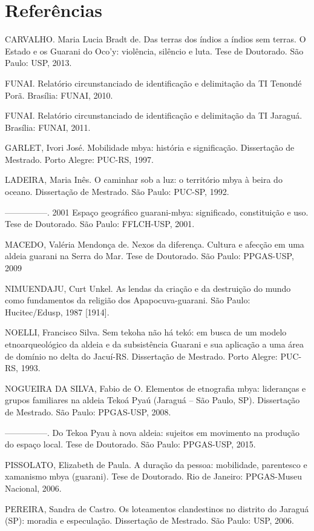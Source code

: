 \section{Referências} 

CARVALHO. Maria Lucia Bradt de. Das terras dos índios a índios sem
terras. O Estado e os Guarani do Oco’y: violência, silêncio e luta.
Tese de Doutorado. São Paulo: USP, 2013.

FUNAI. Relatório circunstanciado de identificação e delimitação da TI
Tenondé Porã. Brasília: FUNAI, 2010.

FUNAI. Relatório circunstanciado de identificação e delimitação da TI
Jaraguá. Brasília: FUNAI, 2011.

GARLET, Ivori José. Mobilidade mbya: história e significação.
Dissertação de Mestrado. Porto Alegre: PUC-RS, 1997.

LADEIRA, Maria Inês. O caminhar sob a luz: o território mbya à beira do
oceano. Dissertação de Mestrado. São Paulo: PUC-SP, 1992. 

—————. 2001 Espaço geográfico guarani-mbya: significado, constituição e
uso. Tese de Doutorado. São Paulo: FFLCH-USP, 2001.

MACEDO, Valéria Mendonça de. Nexos da diferença. Cultura e afecção em
uma aldeia guarani na Serra do Mar. Tese de Doutorado. São Paulo:
PPGAS-USP, 2009

NIMUENDAJU, Curt Unkel. As lendas da criação e da destruição do mundo
como fundamentos da religião dos Apapocuva-guarani. São Paulo:
Hucitec/Edusp, 1987 [1914].

NOELLI, Francisco Silva. Sem tekoha não há tekó: em busca de um modelo
etnoarqueológico da aldeia e da subsistência Guarani e sua aplicação a
uma área de domínio no delta do Jacuí-RS. Dissertação de Mestrado.
Porto Alegre: PUC-RS, 1993.

NOGUEIRA DA SILVA, Fabio de O. Elementos de etnografia mbya: lideranças
e grupos familiares na aldeia Tekoá Pyaú (Jaraguá – São Paulo, SP).
Dissertação de Mestrado. São Paulo: PPGAS-USP, 2008.

—————. Do Tekoa Pyau à nova aldeia: sujeitos em movimento na produção do
espaço local. Tese de Doutorado. São Paulo: PPGAS-USP, 2015.

PISSOLATO, Elizabeth de Paula. A duração da pessoa: mobilidade,
parentesco e xamanismo mbya (guarani). Tese de Doutorado. Rio de
Janeiro: PPGAS-Museu Nacional, 2006.  

PEREIRA, Sandra de Castro. Os loteamentos clandestinos no distrito do
Jaraguá (SP): moradia e especulação. Dissertação de Mestrado. São
Paulo: USP, 2006.

